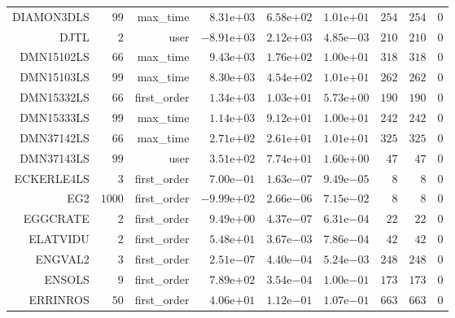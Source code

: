 \begin{longtable}{rrrrrrrrr}
DIAMON3DLS & \(    99\) & max\_time & \( 8.31\)e\(+03\) & \( 6.58\)e\(+02\) & \( 1.01\)e\(+01\) & \(   254\) & \(   254\) & \(     0\) \\
DJTL & \(     2\) & user & \(-8.91\)e\(+03\) & \( 2.12\)e\(+03\) & \( 4.85\)e\(-03\) & \(   210\) & \(   210\) & \(     0\) \\
DMN15102LS & \(    66\) & max\_time & \( 9.43\)e\(+03\) & \( 1.76\)e\(+02\) & \( 1.00\)e\(+01\) & \(   318\) & \(   318\) & \(     0\) \\
DMN15103LS & \(    99\) & max\_time & \( 8.30\)e\(+03\) & \( 4.54\)e\(+02\) & \( 1.01\)e\(+01\) & \(   262\) & \(   262\) & \(     0\) \\
DMN15332LS & \(    66\) & first\_order & \( 1.34\)e\(+03\) & \( 1.03\)e\(+01\) & \( 5.73\)e\(+00\) & \(   190\) & \(   190\) & \(     0\) \\
DMN15333LS & \(    99\) & max\_time & \( 1.14\)e\(+03\) & \( 9.12\)e\(+01\) & \( 1.00\)e\(+01\) & \(   242\) & \(   242\) & \(     0\) \\
DMN37142LS & \(    66\) & max\_time & \( 2.71\)e\(+02\) & \( 2.61\)e\(+01\) & \( 1.01\)e\(+01\) & \(   325\) & \(   325\) & \(     0\) \\
DMN37143LS & \(    99\) & user & \( 3.51\)e\(+02\) & \( 7.74\)e\(+01\) & \( 1.60\)e\(+00\) & \(    47\) & \(    47\) & \(     0\) \\
ECKERLE4LS & \(     3\) & first\_order & \( 7.00\)e\(-01\) & \( 1.63\)e\(-07\) & \( 9.49\)e\(-05\) & \(     8\) & \(     8\) & \(     0\) \\
EG2 & \(  1000\) & first\_order & \(-9.99\)e\(+02\) & \( 2.66\)e\(-06\) & \( 7.15\)e\(-02\) & \(     8\) & \(     8\) & \(     0\) \\
EGGCRATE & \(     2\) & first\_order & \( 9.49\)e\(+00\) & \( 4.37\)e\(-07\) & \( 6.31\)e\(-04\) & \(    22\) & \(    22\) & \(     0\) \\
ELATVIDU & \(     2\) & first\_order & \( 5.48\)e\(+01\) & \( 3.67\)e\(-03\) & \( 7.86\)e\(-04\) & \(    42\) & \(    42\) & \(     0\) \\
ENGVAL2 & \(     3\) & first\_order & \( 2.51\)e\(-07\) & \( 4.40\)e\(-04\) & \( 5.24\)e\(-03\) & \(   248\) & \(   248\) & \(     0\) \\
ENSOLS & \(     9\) & first\_order & \( 7.89\)e\(+02\) & \( 3.54\)e\(-04\) & \( 1.00\)e\(-01\) & \(   173\) & \(   173\) & \(     0\) \\
ERRINROS & \(    50\) & first\_order & \( 4.06\)e\(+01\) & \( 1.12\)e\(-01\) & \( 1.07\)e\(-01\) & \(   663\) & \(   663\) & \(     0\) \\

\end{longtable}
